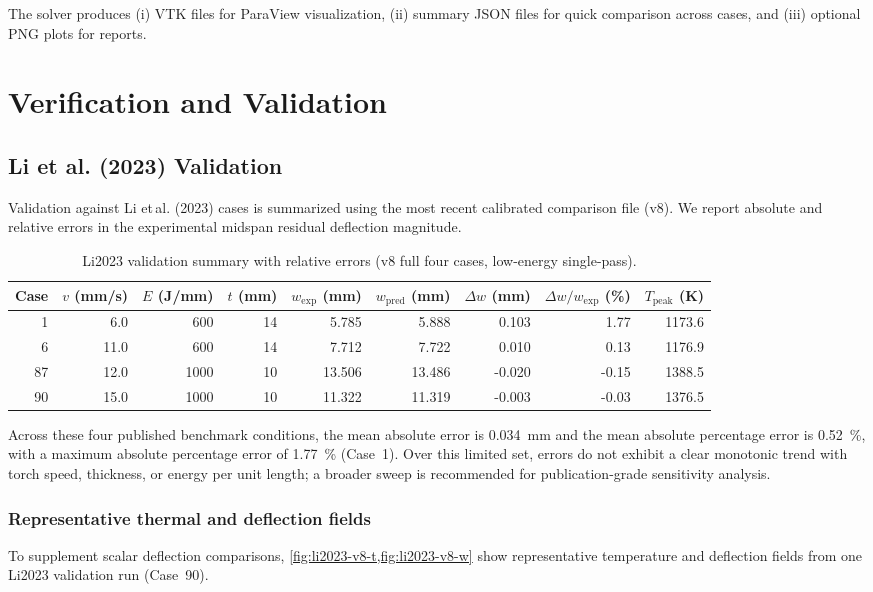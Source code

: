 \documentclass[11pt,a4paper]{article}
\begin{document}
The solver produces (i) VTK files for ParaView visualization, (ii) summary JSON files for quick comparison across cases, and (iii) optional PNG plots for reports.

\section{Verification and Validation}
\subsection{Li et al. (2023) Validation}
Validation against Li et\,al. (2023) cases is summarized using the most recent calibrated comparison file (v8). We report absolute and relative errors in the experimental midspan residual deflection magnitude.

\begin{table}[H]
\centering
\caption{Li2023 validation summary with relative errors (v8 full four cases, low-energy single-pass).}
\begin{tabular}{rrrrrrrrr}
\toprule
Case & $v$ (mm/s) & $E$ (J/mm) & $t$ (mm) & $w_{\mathrm{exp}}$ (mm) & $w_{\mathrm{pred}}$ (mm) & $\Delta w$ (mm) & $\Delta w / w_{\mathrm{exp}}$ (\%) & $T_{\mathrm{peak}}$ (K) \\
\midrule
1 & 6.0 & 600 & 14 & 5.785 & 5.888 & 0.103 & 1.77 & 1173.6 \\
6 & 11.0 & 600 & 14 & 7.712 & 7.722 & 0.010 & 0.13 & 1176.9 \\
87 & 12.0 & 1000 & 10 & 13.506 & 13.486 & -0.020 & -0.15 & 1388.5 \\
90 & 15.0 & 1000 & 10 & 11.322 & 11.319 & -0.003 & -0.03 & 1376.5 \\
\bottomrule
\end{tabular}
\end{table}

Across these four published benchmark conditions, the mean absolute error is \SI{0.034}{mm} and the mean absolute percentage error is \SI{0.52}{\%}, with a maximum absolute percentage error of \SI{1.77}{\%} (Case~1). Over this limited set, errors do not exhibit a clear monotonic trend with torch speed, thickness, or energy per unit length; a broader sweep is recommended for publication-grade sensitivity analysis.

\subsubsection{Representative thermal and deflection fields}
To supplement scalar deflection comparisons, \cref{fig:li2023-v8-t,fig:li2023-v8-w} show representative temperature and deflection fields from one Li2023 validation run (Case~90).
\end{document}
